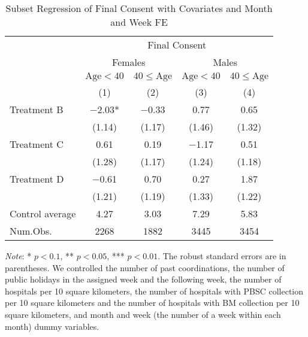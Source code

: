 \documentclass[12pt, a4paper]{article}
\begin{document}
\begin{table}[H]

\caption{\label{tab:consent-lm-subset2}Subset Regression of Final Consent with Covariates and Month and Week FE}
\centering
\fontsize{8}{10}\selectfont
\begin{threeparttable}
\begin{tabular}[t]{lcccc}
\toprule
\multicolumn{1}{c}{ } & \multicolumn{4}{c}{Final Consent} \\
\cmidrule(l{3pt}r{3pt}){2-5}
\multicolumn{1}{c}{ } & \multicolumn{2}{c}{Females} & \multicolumn{2}{c}{Males} \\
\cmidrule(l{3pt}r{3pt}){2-3} \cmidrule(l{3pt}r{3pt}){4-5}
\multicolumn{1}{c}{ } & \multicolumn{1}{c}{$\text{Age} < 40$} & \multicolumn{1}{c}{$40 \le \text{Age}$} & \multicolumn{1}{c}{$\text{Age} < 40$} & \multicolumn{1}{c}{$40 \le \text{Age}$} \\
\cmidrule(l{3pt}r{3pt}){2-2} \cmidrule(l{3pt}r{3pt}){3-3} \cmidrule(l{3pt}r{3pt}){4-4} \cmidrule(l{3pt}r{3pt}){5-5}
  & (1) & (2) & (3) & (4)\\
\midrule
Treatment B & \num{-2.03}* & \num{-0.33} & \num{0.77} & \num{0.65}\\
 & (\num{1.14}) & (\num{1.17}) & (\num{1.46}) & (\num{1.32})\\
Treatment C & \num{0.61} & \num{0.19} & \num{-1.17} & \num{0.51}\\
 & (\num{1.28}) & (\num{1.17}) & (\num{1.24}) & (\num{1.18})\\
Treatment D & \num{-0.61} & \num{0.70} & \num{0.27} & \num{1.87}\\
 & (\num{1.21}) & (\num{1.19}) & (\num{1.33}) & (\num{1.22})\\
\midrule
Control average & 4.27 & 3.03 & 7.29 & 5.83\\
Num.Obs. & \num{2268} & \num{1882} & \num{3445} & \num{3454}\\
\bottomrule
\end{tabular}
\begin{tablenotes}
\item \emph{Note}: * $p < 0.1$, ** $p < 0.05$, *** $p < 0.01$. The robust standard errors are in parentheses. We controlled the number of past coordinations, the number of public holidays in the assigned week and the following week, the number of hospitals per 10 square kilometers, the number of hospitals with PBSC collection per 10 square kilometers and the number of hospitals with BM collection per 10 square kilometers, and month and week (the number of a week within each month) dummy variables.
\end{tablenotes}
\end{threeparttable}
\end{table}
\end{document}

